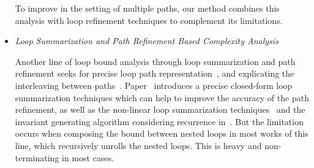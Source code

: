 \begin{itemize}
  To improve in the setting of multiple paths, our method combines this analysis with loop refinement techniques to complement its limitations.
\item
\emph{Loop Summarization and Path Refinement Based Complexity Analysis}

Another line of loop bound analysis through loop summarization and path refinement seeks for precise loop path representation~\cite{ManoliosV06,BalakrishnanSIG09,SharmaDDA11,Flores-MontoyaH14,HumenbergerJK18,CyphertBKR19}, and explicating the interleaving between paths~\cite{GulwaniJK09,ZulegerGSV11}.
Paper~\cite{KincaidBCR19} introduces a precise closed-form loop summarization techniques which can help to improve the accuracy of the path refinement, as well as the non-linear loop summarization techniques~\cite{KincaidCBR18} and the invariant generating algorithm considering recurrence in~\cite{BreckCKR20}. 
But the limitation occurs when composing the bound between nested loops in most works of this line, which recursively unrolls the nested loops. This is heavy and non-terminating in most cases.



\end{itemize}
